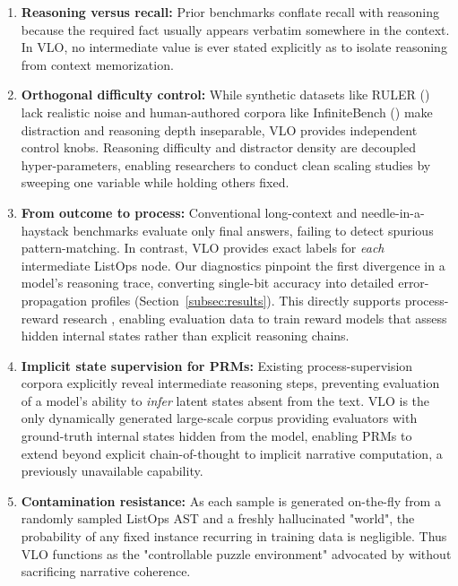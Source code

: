 \documentclass{article}
\begin{document}
\begin{enumerate}
  \item \textbf{Reasoning versus recall:}
        Prior benchmarks conflate recall with reasoning because the required fact usually appears verbatim somewhere in the context.  In VLO, no intermediate value is ever stated explicitly as to isolate reasoning from context memorization.

  \item \textbf{Orthogonal difficulty control:}
        While synthetic datasets like RULER (\citeyear{ruler}) lack realistic noise and human-authored corpora like InfiniteBench (\citeyear{infinitebench}) make distraction and reasoning depth inseparable, VLO provides independent control knobs. Reasoning difficulty and distractor density are decoupled hyper-parameters, enabling researchers to conduct clean scaling studies by sweeping one variable while holding others fixed.

  \item \textbf{From outcome to process:}
        Conventional long-context and needle-in-a-haystack benchmarks evaluate only final answers, failing to detect spurious pattern-matching. In contrast, VLO provides exact labels for \emph{each} intermediate ListOps node. Our diagnostics pinpoint the first divergence in a model's reasoning trace, converting single-bit accuracy into detailed error-propagation profiles (Section~\ref{subsec:results}). This directly supports process-reward research \citep{PRM800K_paper,Zhang2025LessonsPRM}, enabling evaluation data to train reward models that assess hidden internal states rather than explicit reasoning chains.

  \item \textbf{Implicit state supervision for PRMs:}
        Existing process-supervision corpora explicitly reveal intermediate reasoning steps, preventing evaluation of a model's ability to \emph{infer} latent states absent from the text. VLO is the only dynamically generated large-scale corpus providing evaluators with ground-truth internal states hidden from the model, enabling PRMs to extend beyond explicit chain-of-thought to implicit narrative computation, a previously unavailable capability.

  \item \textbf{Contamination resistance:}
        As each sample is generated on-the-fly from a randomly sampled ListOps AST and a freshly hallucinated "world", the probability of any fixed instance recurring in training data is negligible. Thus VLO functions as the "controllable puzzle environment" advocated by \citet{IllusionOfThinking} without sacrificing narrative coherence.


\end{enumerate}
\end{document}
